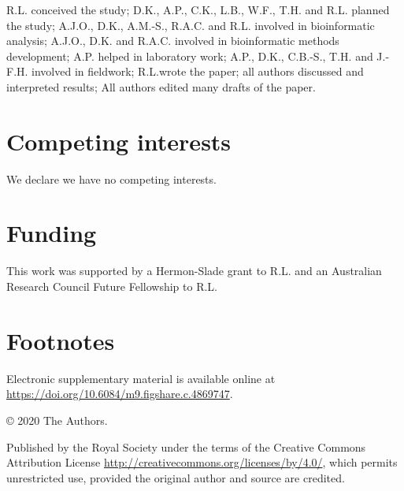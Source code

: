 R.L. conceived the study; D.K., A.P., C.K., L.B., W.F., T.H. and R.L. planned the study; A.J.O., D.K., A.M.-S., R.A.C. and R.L. involved in bioinformatic analysis; A.J.O., D.K. and R.A.C. involved in bioinformatic methods development; A.P. helped in laboratory work; A.P., D.K., C.B.-S., T.H. and J.-F.H. involved in fieldwork; R.L.wrote the paper; all authors discussed and interpreted results; All authors edited many drafts of the paper.

\section{Competing interests}

We declare we have no competing interests.

\section{Funding}

This work was supported by a Hermon-Slade grant to R.L. and an Australian Research Council Future Fellowship to R.L.

\section{Footnotes}

Electronic supplementary material is available online at \url{https://doi.org/10.6084/m9.figshare.c.4869747}.

© 2020 The Authors.

Published by the Royal Society under the terms of the Creative Commons Attribution License \url{http://creativecommons.org/licenses/by/4.0/}, which permits unrestricted use, provided the original author and source are credited.

\printbibliography[segment=\therefsegment]{}
